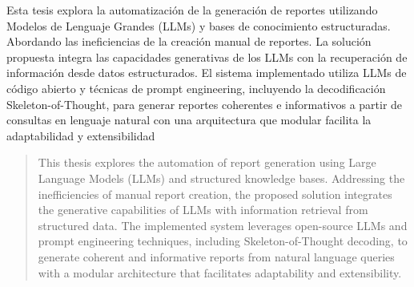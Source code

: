 \begin{resumen}
	Esta tesis explora la automatización de la generación de reportes utilizando Modelos de Lenguaje Grandes (LLMs) y bases de conocimiento estructuradas. Abordando las ineficiencias de la creación manual de reportes. La solución propuesta integra las capacidades generativas de los LLMs con la recuperación de información desde datos estructurados. El sistema implementado utiliza LLMs de código abierto y técnicas de prompt engineering, incluyendo la decodificación Skeleton-of-Thought, para generar reportes coherentes e informativos a partir de consultas en lenguaje natural con una arquitectura que modular facilita la adaptabilidad y extensibilidad
\end{resumen}

\begin{abstract}
	This thesis explores the automation of report generation using Large Language Models (LLMs) and structured knowledge bases. Addressing the inefficiencies of manual report creation, the proposed solution integrates the generative capabilities of LLMs with information retrieval from structured data. The implemented system leverages open-source LLMs and prompt engineering techniques, including Skeleton-of-Thought decoding, to generate coherent and informative reports from natural language queries with a modular architecture that facilitates adaptability and extensibility.
\end{abstract}
